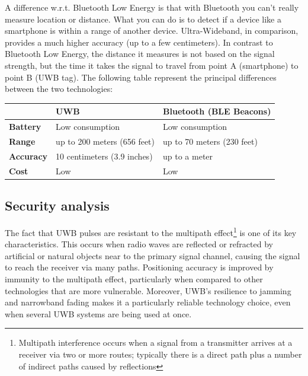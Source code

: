 \documentclass[english]{article}
\begin{document}
A difference w.r.t. Bluetooth Low Energy is that with Bluetooth you can’t really measure location or distance. What you can do is to detect if a device like a smartphone is within a range of another device. Ultra-Wideband, in comparison, provides a much higher accuracy (up to a few centimeters). In contrast to Bluetooth Low Energy, the distance it measures is not based on the signal strength, but the time it takes the signal to travel from point A (smartphone) to point B (UWB tag). The following table represent the principal differences between the two technologies:

\begin{table}[h]
  \begin{tabular}{l|l|l|}
  \cline{2-3}
  {}                               & {\textbf{UWB}}                & { \textbf{Bluetooth (BLE Beacons)}} \\ \hline
  \multicolumn{1}{|l|}{{  \textbf{Battery}}}  & {  Low consumption}             & {  Low consumption}                  \\ \hline
  \multicolumn{1}{|l|}{{  \textbf{Range}}}    & {  up to 200 meters (656 feet)} & {  up to 70 meters (230 feet)}       \\ \hline
  \multicolumn{1}{|l|}{{  \textbf{Accuracy}}} & {  10 centimeters (3.9 inches)} & {  up to a meter}                    \\ \hline
  \multicolumn{1}{|l|}{{  \textbf{Cost}}}     & {  Low}                         & {  Low}                              \\ \hline
  \end{tabular}
  \end{table}

\subsection{Security analysis}
The fact that UWB pulses are resistant to the multipath effect\footnote{Multipath interference occurs when a signal from a transmitter arrives at a receiver via two or more routes; typically there is a direct path plus a number of indirect paths caused by reflections} is one of its key characteristics. This occurs when radio waves are reflected or refracted by artificial or natural objects near to the primary signal channel, causing the signal to reach the receiver via many paths. Positioning accuracy is improved by immunity to the multipath effect, particularly when compared to other technologies that are more vulnerable. Moreover, UWB's resilience to jamming and narrowband fading makes it a particularly reliable technology choice, even when several UWB systems are being used at once.
\end{document}
